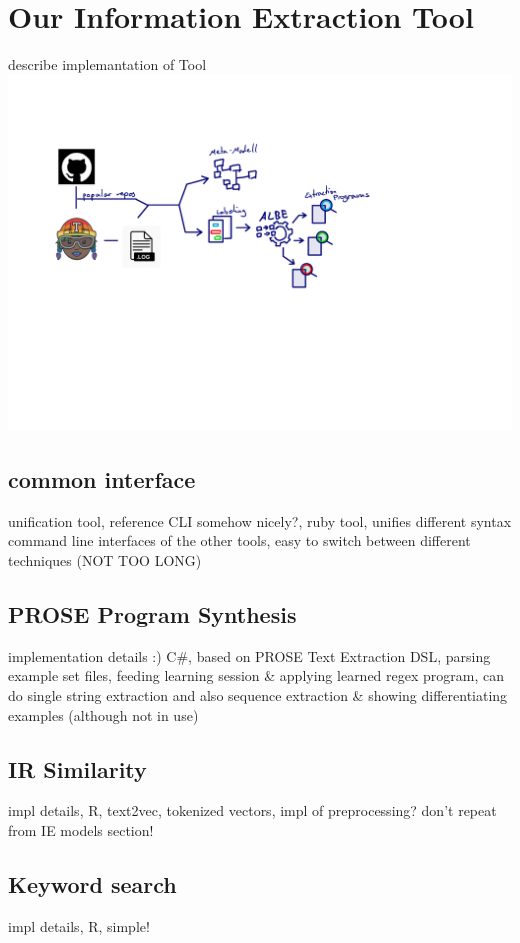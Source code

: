 \documentclass[\myrootdir/main.tex]{subfiles}
\begin{document}
\chapter{Our Information Extraction Tool}
\label{implementation}
describe implemantation of Tool
\includegraphics[page=7, width=\textwidth, trim={0.5cm 0.5cm 0.5cm 0.5cm}, clip]{img/flow-of-research.pdf}

\section{common interface} 
unification tool, reference CLI somehow nicely?,
ruby tool, unifies different syntax command line interfaces of the other tools, easy to switch between different techniques (NOT TOO LONG)

\section{PROSE Program Synthesis}
implementation details :)
C#, based on PROSE Text Extraction DSL, parsing example set files, feeding learning session \& applying learned regex program, can do single string extraction and also sequence extraction \& showing differentiating examples (although not in use)

\section{IR Similarity}
impl details,
R, text2vec, tokenized vectors, impl of preprocessing?
don't repeat from IE models section!

\section{Keyword search}
impl details,
R, simple!
\end{document}
